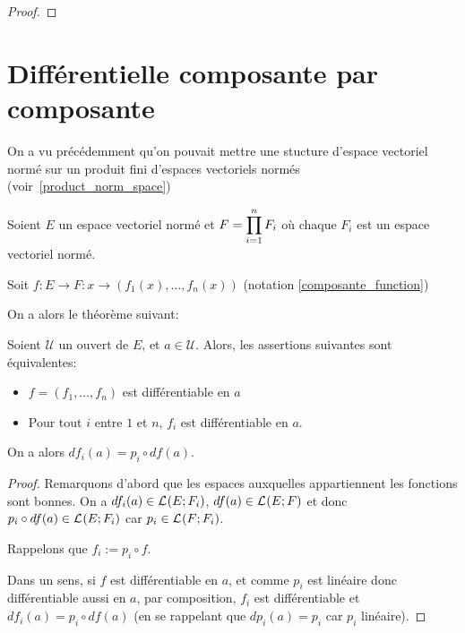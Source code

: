 \ifdefined\outputproof
\begin{proof}

\end{proof}
\fi

\section{Différentielle composante par composante}
\label{section_differential_composante}


On a vu précédemment qu'on pouvait mettre une stucture d'espace vectoriel
normé sur un produit fini d'espaces vectoriels normés (voir~\ref{product_norm_space})

Soient $E$ un espace vectoriel normé et $F = \displaystyle \prod_{i = 1}^{n} F_{i}$ où chaque
$F_{i}$ est un espace vectoriel normé.

Soit $f : E \rightarrow F : x \rightarrow (f_{1}(x), \ldots, f_{n}(x))$
(notation \ref{composante_function})

On a alors le théorème suivant:

\begin{theorem}
	\label{differential_composante}
	Soient $\mathcal{U}$ un ouvert de $E$, et $a \in \mathcal{U}$. Alors, les
	assertions suivantes sont équivalentes:

	\begin{itemize}
		\item $f = (f_{1}, \ldots, f_{n})$ est différentiable en $a$
		\item Pour tout $i$ entre $1$ et $n$, $f_{i}$ est différentiable en $a$.
	\end{itemize}

	On a alors $df_{i}(a) = p_{i} \circ df(a)$.
\end{theorem}

\ifdefined\outputproof
\begin{proof}
	Remarquons d'abord que les espaces auxquelles appartiennent les fonctions
	sont bonnes. On a $df_{i}(a) \in \mathcal{L}_{}(E; F_{i})$, $df(a) \in
	\mathcal{L}_{}(E; F)$ et donc $p_{i} \circ df(a) \in
	\mathcal{L}_{}(E; F_{i})$ car $p_{i} \in
	\mathcal{L}_{}(F; F_{i})$.

	Rappelons que $f_{i} := p_{i} \circ f$.

	Dans un sens, si $f$ est différentiable en $a$, et comme $p_{i}$ est
	linéaire donc différentiable aussi en $a$, par composition, $f_{i}$ est
	différentiable et $df_{i}(a) = p_{i} \circ df(a)$ (en se rappelant que
	$dp_{i}(a) = p_{i}$ car $p_{i}$ linéaire).
\end{proof}
\fi

